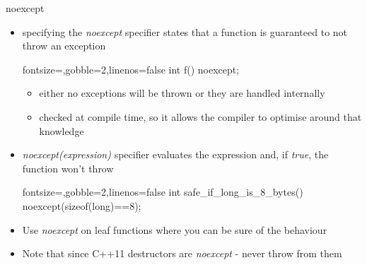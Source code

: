 \begin{frame}[fragile]
  \begin{block}{noexcept}
    \begin{itemize}
      \item specifying the \textit{noexcept} specifier states that a function is guaranteed to not throw an exception
      \begin{cppcode*}{fontsize=\scriptsize,gobble=2,linenos=false}
        int f() noexcept;
      \end{cppcode*}
      \begin{itemize}
        \item either no exceptions will be thrown or they are handled internally
        \item checked at compile time, so it allows the compiler to optimise around that knowledge
      \end{itemize}
      \item \textit{noexcept(expression)} specifier evaluates the expression and, if \textit{true}, the function won't throw
        \begin{cppcode*}{fontsize=\scriptsize,gobble=2,linenos=false}
          int safe_if_long_is_8_bytes() noexcept(sizeof(long)==8);
        \end{cppcode*}
      \item Use \textit{noexcept} on leaf functions where you can be sure of the behaviour
      \item Note that since C++11 destructors are \textit{noexcept} - never throw from them
    \end{itemize}
  \end{block}
\end{frame}

